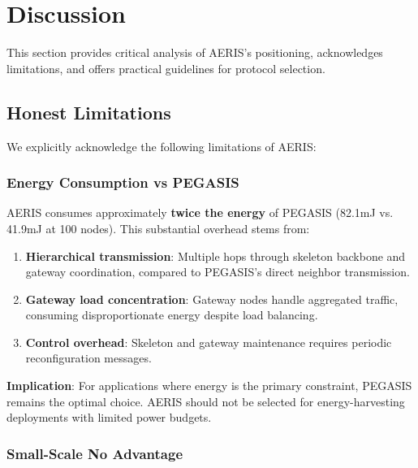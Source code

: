 
\section{Discussion}
\label{sec:discussion}

This section provides critical analysis of AERIS's positioning, acknowledges
limitations, and offers practical guidelines for protocol selection.

\subsection{Honest Limitations}

We explicitly acknowledge the following limitations of AERIS:

\subsubsection{Energy Consumption vs PEGASIS}

AERIS consumes approximately \textbf{twice the energy} of PEGASIS (82.1mJ
vs. 41.9mJ at 100 nodes). This substantial overhead stems from:

\begin{enumerate}
    \item \textbf{Hierarchical transmission}: Multiple hops through skeleton
    backbone and gateway coordination, compared to PEGASIS's direct neighbor
    transmission.

    \item \textbf{Gateway load concentration}: Gateway nodes handle aggregated
    traffic, consuming disproportionate energy despite load balancing.

    \item \textbf{Control overhead}: Skeleton and gateway maintenance requires
    periodic reconfiguration messages.
\end{enumerate}

\textbf{Implication}: For applications where energy is the primary constraint,
PEGASIS remains the optimal choice. AERIS should not be selected for
energy-harvesting deployments with limited power budgets.

\subsubsection{Small-Scale No Advantage}

